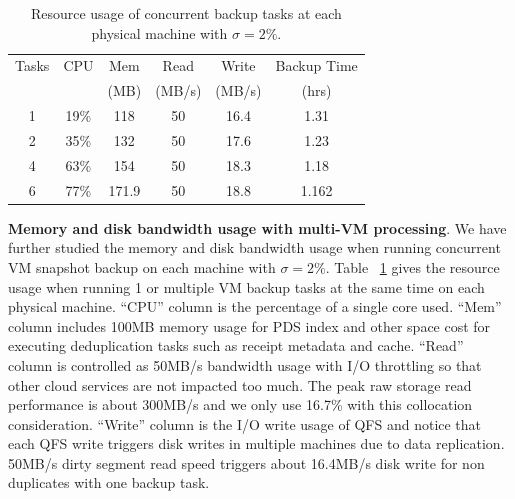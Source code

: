 \begin{table}
\begin{small}
    \begin{tabular}{|c|c|c|c|c|c|}
    \hline
    Tasks & CPU & Mem &Read &  Write  & Backup Time  \\ 
    & & (MB)          &(MB/s) &  (MB/s) & (hrs) \\ \hline
    1     & 19\% & 118 & 50 & 16.4 & 1.31\\ \hline
    2     & 35\% & 132 &50  & 17.6 & 1.23\\ \hline
    4     & 63\% & 154&50   & 18.3 & 1.18\\ \hline
    6     & 77\% & 171.9 & 50 &  18.8 & 1.162\\ \hline
    \end{tabular}
\end{small}
\caption{Resource usage of concurrent backup tasks at each physical machine with $\sigma=2\%$.}
\label{tab:resource_usage}
\end{table}

{\bf Memory and disk bandwidth usage with multi-VM processing}. 
We have further studied the memory and disk bandwidth usage 
when running concurrent VM snapshot backup on each machine with $\sigma=2\%$. 
Table ~\ref{tab:resource_usage} gives the resource usage  when
running 1 or multiple  VM backup tasks at the same time on each physical machine. 
``CPU'' column is the percentage of a single core used. 
``Mem'' column includes 100MB memory usage for PDS index and other space cost for executing deduplication tasks such as 
receipt metadata and cache. 
``Read'' column is controlled as 50MB/s bandwidth usage with I/O throttling so that other cloud services are not impacted too much.
The peak raw storage read performance is about 300MB/s and we only use 16.7\% with this collocation consideration.
``Write'' column is the I/O write usage of QFS and notice that each QFS write triggers disk writes in multiple machines due to
data replication.     50MB/s dirty segment read speed triggers about 16.4MB/s disk write for non duplicates with one backup task.

